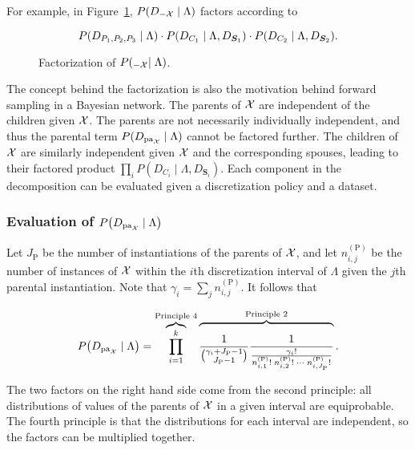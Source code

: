 For example, in Figure~\ref{fig:example_factorization}, $P(D_{-\mathcal{X}} \mid \Lambda)$ factors according to

\begin{equation}
  P\paren{D_{P_1,P_2,P_3} \mid \Lambda} \cdot P\paren{ D_{ C_1 } \mid \Lambda, D_{\bm{S}_1} } \cdot P\paren{D_{C_2} \mid \Lambda, D_{\bm{S}_2}}\text{.}
\end{equation}

\begin{figure}[ht]
  \centering
  
  \caption{Factorization of $P(_{-\mathcal{X}} \mid \Lambda)$.}
  \label{fig:example_factorization}
\end{figure}

The concept behind the factorization is also the motivation behind forward sampling in a Bayesian network.
The parents of $\mathcal{X}$ are independent of the children given $\mathcal{X}$.
The parents are not necessarily individually independent, and thus the parental term $P(D_{\operatorname{pa}_{\mathcal{X}}} \mid \Lambda)$ cannot be factored further.
The children of $\mathcal{X}$ are similarly independent given $\mathcal{X}$ and the corresponding spouses, leading to their factored product $\prod_{i} P(D_{C_i} \mid \Lambda, D_{\bm{S}_i})$.
Each component in the decomposition can be evaluated given a discretization policy and a dataset.

\subsubsection{Evaluation of $P\paren{D_{\Pa_{\cX}} \mid \Lambda}$}

Let $J_\text{P}$ be the number of instantiations of the parents of $\mathcal{X}$, and let $n^{(\text{P})}_{i,j}$ be the number of instances of $\mathcal{X}$ within the $i$th discretization interval of $\Lambda$ given the $j$th parental instantiation.
Note that $\gamma_i = \sum_j n^{(\text{P})}_{i,j}$.
It follows that

\begin{equation}
  \label{eq:likelihood_one}
  P\paren{D_{\Pa_{\cX}} \mid \Lambda} = \overbrace{\prod_{i=1}^k}^{\text{Principle 4}}
    \overbrace{\rule{0pt}{2em}
      \frac{1}{{{\gamma_i + J_\text{P} - 1}\choose{J_\text{P} - 1}}}
      \frac{1}{
        \frac{
          {\gamma_i}!
        }{
          {n^{(\text{P})}_{i,1}}! \; {n^{(\text{P})}_{i,2}}! \; \cdots \; {n^{(\text{P})}_{i,J_\text{P}}}!
        }
      }
    }^{\text{Principle 2}}\text{.}
\end{equation}

The two factors on the right hand side come from the second principle: all distributions of values of the parents of $\mathcal{X}$ in a given interval are equiprobable.
The fourth principle is that the distributions for each interval are independent, so the factors can be multiplied together.


